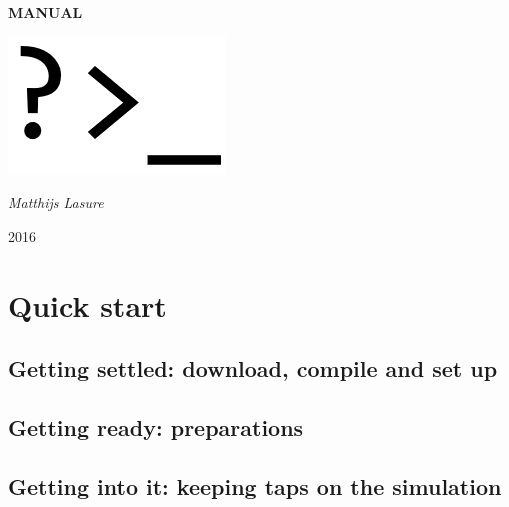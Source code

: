 \documentclass[a4paper,fleqn]{report}
\begin{document}
	
	\pagestyle{MyStyle}
	
	\begin{titlepage}
		\centering
		\null
		\vspace{5cm}

		{\huge\bfseries MANUAL\par}
		\vspace{1.5cm}
		\includegraphics[width=0.5\linewidth]{images/prompt.png}
		\vfill
		
		{\Large\itshape Matthijs Lasure\par}
		
		\vspace{1.5cm}
		
		{\large 2016\par}
		
	\end{titlepage}
	
	\tableofcontents
	
	\part{Quick start}
	
	\chapter{Getting settled: download, compile and set up}
	
	
	\chapter{Getting ready: preparations}
	
	
	
	\chapter{Getting into it: keeping taps on the simulation}
	
	
\end{document}
